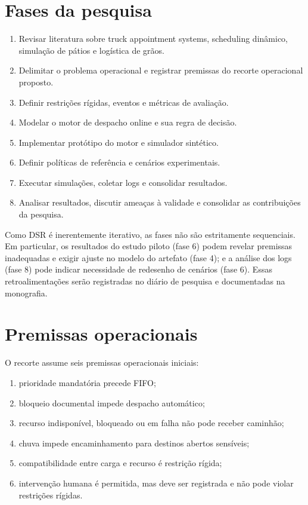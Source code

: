 \documentclass[
  12pt,
  oneside,
  a4paper,
  sumario=tradicional,
  brazil
]{abntex2}
\begin{document}
\section{Fases da pesquisa}
\begin{enumerate}[leftmargin=1.27cm,itemsep=0pt,topsep=0pt,parsep=0pt,partopsep=0pt]
  \item Revisar literatura sobre truck appointment systems, scheduling din\^amico, simula\c{c}\~ao de p\'atios e log\'istica de gr\~aos.
  \item Delimitar o problema operacional e registrar premissas do recorte operacional proposto.
  \item Definir restri\c{c}\~oes r\'igidas, eventos e m\'etricas de avalia\c{c}\~ao.
  \item Modelar o motor de despacho online e sua regra de decis\~ao.
  \item Implementar prot\'otipo do motor e simulador sint\'etico.
  \item Definir pol\'iticas de refer\^encia e cen\'arios experimentais.
  \item Executar simula\c{c}\~oes, coletar logs e consolidar resultados.
  \item Analisar resultados, discutir amea\c{c}as \`a validade e consolidar as contribui\c{c}\~oes da pesquisa.
\end{enumerate}

Como DSR \'e inerentemente iterativo, as fases n\~ao s\~ao estritamente sequenciais. Em particular, os resultados do estudo piloto (fase 6) podem revelar premissas inadequadas e exigir ajuste no modelo do artefato (fase 4); e a an\'alise dos logs (fase 8) pode indicar necessidade de redesenho de cen\'arios (fase 6). Essas retroalimenta\c{c}\~oes ser\~ao registradas no di\'ario de pesquisa e documentadas na monografia.

\section{Premissas operacionais}
O recorte assume seis premissas operacionais iniciais:
\begin{enumerate}[leftmargin=1.27cm,itemsep=0pt,topsep=0pt,parsep=0pt,partopsep=0pt]
  \item prioridade mandat\'oria precede FIFO;
  \item bloqueio documental impede despacho autom\'atico;
  \item recurso indispon\'ivel, bloqueado ou em falha n\~ao pode receber caminh\~ao;
  \item chuva impede encaminhamento para destinos abertos sens\'iveis;
  \item compatibilidade entre carga e recurso \'e restri\c{c}\~ao r\'igida;
  \item interven\c{c}\~ao humana \'e permitida, mas deve ser registrada e n\~ao pode violar restri\c{c}\~oes r\'igidas.
\end{enumerate}
\end{document}
